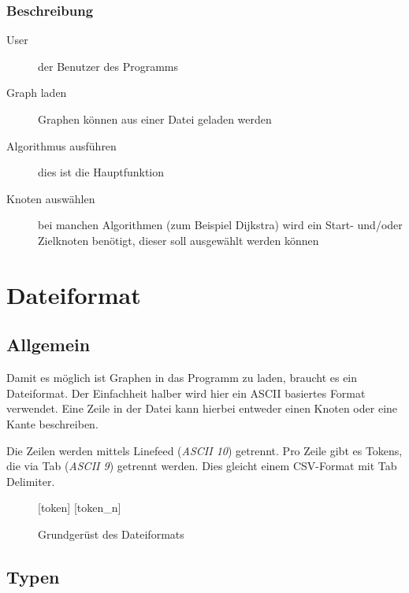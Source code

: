 \documentclass[a4paper,titlepage]{article}
\begin{document}
\subsubsection*{Beschreibung}

\begin{description}
\item[User] der Benutzer des Programms
\item[Graph laden] Graphen können aus einer Datei geladen werden
\item[Algorithmus ausführen] dies ist die Hauptfunktion
\item[Knoten auswählen] bei manchen Algorithmen (zum Beispiel Dijkstra) wird ein Start- und/oder Zielknoten benötigt, dieser soll ausgewählt werden können
\end{description}

\newpage

\section{Dateiformat}

\subsection{Allgemein}

Damit es möglich ist Graphen in das Programm zu laden, braucht es ein Dateiformat. Der Einfachheit halber wird hier ein ASCII basiertes Format verwendet. Eine Zeile in der Datei kann hierbei entweder einen Knoten oder eine Kante beschreiben.

Die Zeilen werden mittels Linefeed (\emph{ASCII 10}) getrennt. Pro Zeile gibt es Tokens, die via Tab (\emph{ASCII 9}) getrennt werden. Dies gleicht einem CSV-Format mit Tab Delimiter.

\begin{figure}[hb]
	\centering
	[typ] \hspace*{3em}  \hspace{2.7em} [token] \hspace{3.4em}  \hspace{2.7em} [token\_n] \hspace{3.7em} 
	\caption{Grundgerüst des Dateiformats}
\end{figure}

\subsection{Typen}
\end{document}
